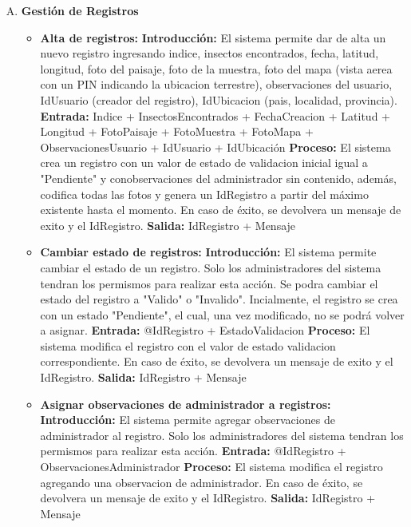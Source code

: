 \begin{enumerate}[A.]
      \item \textbf{Gestión de Registros}
        \begin{itemize}
          \item \textbf{Alta de registros:}
            \tab \textbf{Introducción:} El sistema permite dar de alta un nuevo registro ingresando indice, insectos encontrados, fecha, latitud, longitud, foto del paisaje, foto de la muestra, foto del mapa (vista aerea con un PIN indicando la ubicacion terrestre), observaciones del usuario, IdUsuario (creador del registro), IdUbicacion (pais, localidad, provincia).
            \tab \textbf{Entrada:} Indice + InsectosEncontrados + FechaCreacion + Latitud + Longitud + FotoPaisaje + FotoMuestra + FotoMapa + ObservacionesUsuario + IdUsuario + IdUbicación
            \tab \textbf{Proceso:} El sistema crea un registro con un valor de estado de validacion inicial igual a "Pendiente" y conobservaciones del administrador sin contenido, además, codifica todas las fotos y genera un IdRegistro a partir del máximo existente hasta el momento. En caso de éxito, se devolvera un mensaje de exito y el IdRegistro.
            \tab \textbf{Salida:} IdRegistro + Mensaje

          \item \textbf{Cambiar estado de registros:}
            \tab \textbf{Introducción:} El sistema permite cambiar el estado de un registro. Solo los administradores del sistema tendran los permismos para realizar esta acción. Se podra cambiar el estado del registro a "Valido" o "Invalido". Incialmente, el registro se crea con un estado "Pendiente", el cual, una vez modificado, no se podrá volver a asignar.
            \tab \textbf{Entrada:} @IdRegistro + EstadoValidacion
            \tab \textbf{Proceso:} El sistema modifica el registro con el valor de estado validacion correspondiente. En caso de éxito, se devolvera un mensaje de exito y el IdRegistro.
            \tab \textbf{Salida:} IdRegistro + Mensaje

          \item \textbf{Asignar observaciones de administrador a registros:}
            \tab \textbf{Introducción:} El sistema permite agregar observaciones de administrador al registro. Solo los administradores del sistema tendran los permismos para realizar esta acción.
            \tab \textbf{Entrada:} @IdRegistro + ObservacionesAdministrador
            \tab \textbf{Proceso:} El sistema modifica el registro agregando una observacion de administrador. En caso de éxito, se devolvera un mensaje de exito y el IdRegistro.
            \tab \textbf{Salida:} IdRegistro + Mensaje


\end{itemize}
\end{enumerate}
